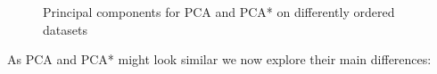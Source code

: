 \documentclass[pdftex,12pt,a4paper]{report}
\begin{document}
\begin{figure}[htb!]
    \caption{Principal components for PCA and PCA* on differently ordered datasets}
    \label{fig:pcs-difference}
\end{figure}
As PCA and PCA* might look similar we now explore their main differences:
\end{document}
